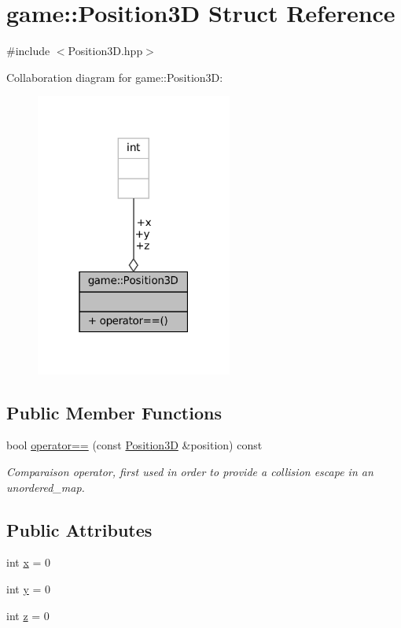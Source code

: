 \hypertarget{structgame_1_1_position3_d}{}\section{game\+:\+:Position3D Struct Reference}
\label{structgame_1_1_position3_d}


{\ttfamily \#include $<$Position3\+D.\+hpp$>$}



Collaboration diagram for game\+:\+:Position3D\+:
\nopagebreak
\begin{figure}[H]
\begin{center}
\leavevmode
\includegraphics[width=183pt]{structgame_1_1_position3_d__coll__graph}
\end{center}
\end{figure}
\subsection*{Public Member Functions}
\begin{DoxyCompactItemize}
\item 
bool \hyperlink{structgame_1_1_position3_d_a8f188c90472d7865740bcdd0d0890f43}{operator==} (const \hyperlink{structgame_1_1_position3_d}{Position3D} \&position) const
\begin{DoxyCompactList}\small\item\em Comparaison operator, first used in order to provide a collision escape in an unordered\+\_\+map. \end{DoxyCompactList}\end{DoxyCompactItemize}
\subsection*{Public Attributes}
\begin{DoxyCompactItemize}
\item 
int \hyperlink{structgame_1_1_position3_d_a425a78e73b2dae4c0e0df297d4476302}{x} = 0
\item 
int \hyperlink{structgame_1_1_position3_d_a5a037f3a9e438e43d7e5711ec3caefa7}{y} = 0
\item 
int \hyperlink{structgame_1_1_position3_d_a51b84044e3c272d06985b3dc5a9f07e7}{z} = 0
\end{DoxyCompactItemize}


